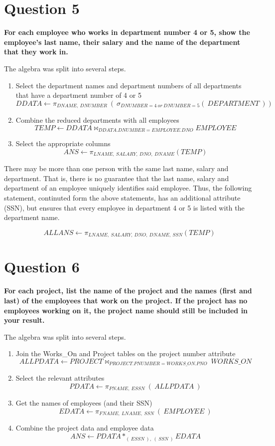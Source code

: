 \documentclass{article}
\begin{document}
\section{Question 5}

    \textbf{For each employee who works in department number 4 or 5, show the employee's last name, their salary and the name of the department that they work in.}

    The algebra was split into several steps.

    \begin{enumerate}
        \item Select the department names and department numbers of all departments that have a department number of 4 or 5
        \[ DDATA \gets \pi _{DNAME, \: DNUMBER} \: ( \: \sigma _{DNUMBER = 4 \: or \: DNUMBER = 5 } ( \: DEPARTMENT \:)) \]
        \item Combine the reduced departments with all employees
        \[ TEMP \gets DDATA \bowtie _{DDATA.DNUMBER = EMPLOYEE.DNO} EMPLOYEE \]
        \item Select the appropriate columns
        \[ ANS \gets \pi _{LNAME, \: SALARY, \: DNO, \: DNAME} (TEMP) \]
    \end{enumerate}

    There may be more than one person with the same last name, salary and department. That is, there is no guarantee that the last name, salary and department of an employee uniquely identifies said employee. Thus, the following statement, continuted form the above statements, has an additional attribute (SSN), but ensures that every employee in department 4 or 5 is listed with the department name.

    \[ ALLANS \gets \pi _{LNAME, \: SALARY, \: DNO, \: DNAME, \: SSN} (TEMP)\]

\section{Question 6}

    \textbf{For each project, list the name of the project and the names (first and last) of the employees that work on the project.  If the project has no employees working on it, the project name should still be included in your result.}
    
    The algebra was split into several steps.

    \begin{enumerate}
        \item Join the Works\_On and Project tables on the project number attribute
        \[ ALLPDATA \gets PROJECT \bowtie _{PROJECT.PNUMBER = WORKS\_ON.PNO} \: WORKS\_ON \]
        \item Select the relevant attributes
        \[ PDATA \gets \pi _{PNAME, \: ESSN} \: ( \: ALLPDATA \: ) \]
        \item Get the names of employees (and their SSN)
        \[ EDATA \gets \pi _{FNAME, \: LNAME, \: SSN} \: ( \: EMPLOYEE \: ) \]
        \item Combine the project data and employee data
        \[ ANS \gets PDATA * _{(\: ESSN \:), \: ( \: SSN \: )} EDATA \]
    \end{enumerate}
\end{document}
